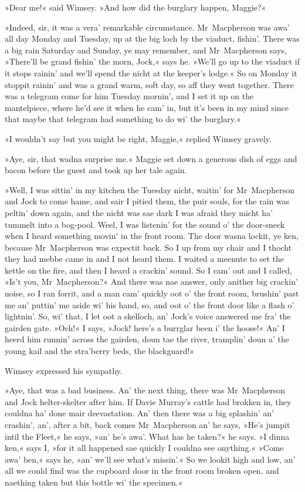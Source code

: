 »Dear me!« said Wimsey. »And how did the burglary happen, Maggie?«

»Indeed, sir, it was a vera' remarkable circumstance. Mr~Macpherson was awa' all day Monday and Tuesday, up at the big loch by the viaduct, fishin'. There was a big rain Saturday and Sunday, ye may remember, and Mr~Macpherson says, »There'll be grand fishin' the morn, Jock,« says he. »We'll go up to the viaduct if it stops rainin' and we'll spend the nicht at the keeper's lodge.« So on Monday it stoppit rainin' and was a grand warm, soft day, so aff they went together. There was a telegram come for him Tuesday mornin', and I set it up on the mantelpiece, where he'd see it when he cam' in, but it's been in my mind since that maybe that telegram had something to do wi' the burglary.«

»I wouldn't say but you might be right, Maggie,« replied Wimsey gravely.

»Aye, sir, that wadna surprise me.« Maggie set down a generous dish of eggs and bacon before the guest and took up her tale again.

»Well, I was sittin' in my kitchen the Tuesday nicht, waitin' for Mr~Macpherson and Jock to come hame, and sair I pitied them, the puir souls, for the rain was peltin' down again, and the nicht was sae dark I was afraid they micht ha' tummelt into a bog-pool. Weel, I was listenin' for the sound o' the door-sneck when I heard something movin' in the front room. The door wasna lockit, ye ken, because Mr~Macpherson was expectit back. So I up from my chair and I thocht they had mebbe came in and I not heard them. I waited a meenute to set the kettle on the fire, and then I heard a crackin' sound. So I cam' out and I called, »Is't you, Mr~Macpherson?« And there was nae answer, only anither big crackin' noise, so I ran forrit, and a man cam' quickly oot o' the front room, brushin' past me an' puttin' me aside wi' his hand, so, and oot o' the front door like a flash o' lightnin'. So, wi' that, I let oot a skelloch, an' Jock's voice answered me fra' the gairden gate. »Och!« I says, »Jock! here's a burrglar been i' the hoose!« An' I heerd him runnin' across the gairden, doun tae the river, tramplin' doun a' the young kail and the stra'berry beds, the blackguard!«

Wimsey expressed his sympathy.

»Aye, that was a bad business. An' the next thing, there was Mr~Macpherson and Jock helter-skelter after him. If Davie Murray's cattle had brokken in, they couldna ha' done mair deevastation. An' then there was a big splashin' an' crashin', an', after a bit, back comes Mr~Macpherson an' he says, »He's jumpit intil the Fleet,« he says, »an' he's awa'. What has he taken?« he says. »I dinna ken,« says I, »for it all happened sae quickly I couldna see onything.« »Come awa' ben,« says he, »an' we'll see what's missin'.« So we lookit high and low, an' all we could find was the cupboard door in the front room broken open, and naething taken but this bottle wi' the specimen.«

